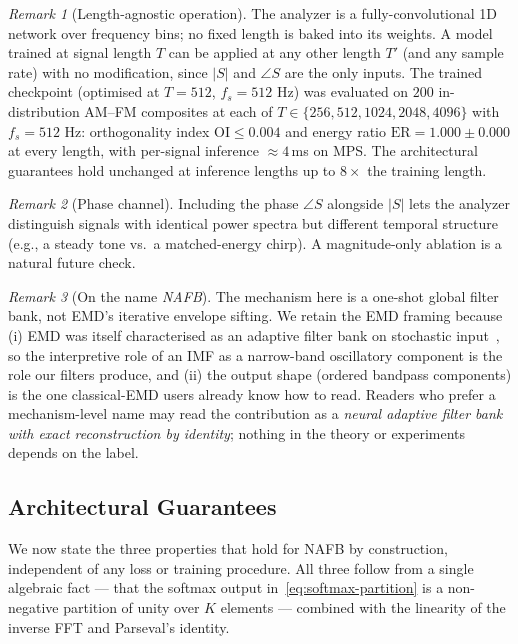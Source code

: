 \documentclass[journal]{IEEEtran}
\theoremstyle{remark}
\newtheorem{remark}{Remark}
\begin{document}
\begin{remark}[Length-agnostic operation]
The analyzer is a fully-convolutional 1D network over frequency bins;
no fixed length is baked into its weights. A model trained at signal
length $T$ can be applied at any other length $T'$ (and any sample
rate) with no modification, since $\lvert S\rvert$ and $\angle S$ are
the only inputs. The trained checkpoint (optimised at $T = 512$,
$f_{s} = 512$ Hz) was evaluated on $200$ in-distribution AM--FM
composites at each of $T \in \{256, 512, 1024, 2048, 4096\}$ with
$f_{s} = 512$ Hz: orthogonality index $\mathrm{OI} \leq 0.004$ and
energy ratio $\mathrm{ER} = 1.000 \pm 0.000$ at every length, with
per-signal inference $\approx 4$\,ms on MPS. The architectural
guarantees hold unchanged at inference lengths up to $8\times$ the
training length.
\end{remark}

\begin{remark}[Phase channel]
Including the phase $\angle S$ alongside $\lvert S\rvert$ lets the
analyzer distinguish signals with identical power spectra but
different temporal structure (e.g., a steady tone vs.\ a matched-energy
chirp). A magnitude-only ablation is a natural future check.
\end{remark}

\begin{remark}[On the name \emph{NAFB}]
The mechanism here is a one-shot global filter bank, not EMD's
iterative envelope sifting. We retain the EMD framing because (i) EMD
was itself characterised as an adaptive filter bank on stochastic
input~\cite{flandrin2004emdfilterbank}, so the interpretive role of
an IMF as a narrow-band oscillatory component is the role our filters
produce, and (ii) the output shape (ordered bandpass components) is
the one classical-EMD users already know how to read. Readers who
prefer a mechanism-level name may read the contribution as a
\emph{neural adaptive filter bank with exact reconstruction by identity}; nothing
in the theory or experiments depends on the label.
\end{remark}

\subsection{Architectural Guarantees}
\label{subsec:theory}

We now state the three properties that hold for NAFB by construction,
independent of any loss or training procedure. All three follow from a
single algebraic fact --- that the softmax output in~\eqref{eq:softmax-partition}
is a non-negative partition of unity over $K$ elements --- combined with
the linearity of the inverse FFT and Parseval's identity.
\end{document}
